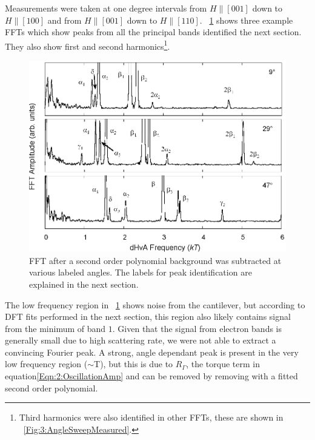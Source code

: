 Measurements were taken at one degree intervals from $H \parallel [001]$ down to $H \parallel [100]$ and from $H \parallel [001]$ down to $H \parallel [110]$. \Fig~\ref{Fig:3:FFTExamples} shows three example FFTs which show peaks from all the principal bands identified the next section. They also show first and second harmonics\footnote{Third harmonics were also identified in other FFTs, these are shown in \fig~\ref{Fig:3:AngleSweepMeasured}.}.
\begin{figure}[h!]
    \begin{center}
        \includegraphics[scale=0.7]{Chapter3-dHvABaFe2P2/Figures/AngleDepMeasurements/FFTExamples/FFTExamples}
        \caption{FFT after a second order polynomial background was subtracted at various labeled angles. The labels for peak identification are explained in the next section.}
        \label{Fig:3:FFTExamples}
    \end{center}
\end{figure}

The low frequency region in \fig~\ref{Fig:3:FFTExamples} shows noise from the cantilever, but according to DFT fits performed in the next section, this region also likely contains signal from the minimum of band $1$. Given that the signal from electron bands is generally small due to high scattering rate, we were not able to extract a convincing Fourier peak. A strong, angle dependant peak is present in the very low frequency region ($\sim$\unit[10]{T}), but this is due to $R_{\Gamma}$, the torque term in equation\ref{Eqn:2:OscillationAmp} and can be removed by removing with a fitted second order polynomial.

